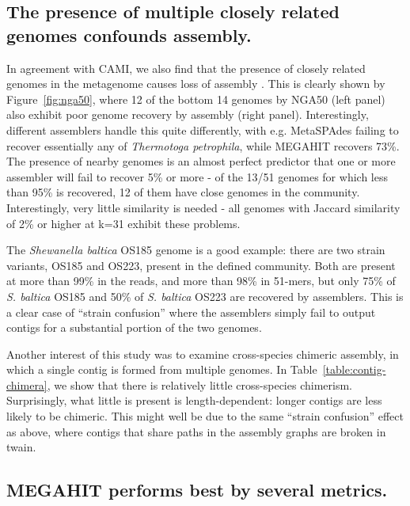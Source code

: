 \documentclass[11pt]{article}
\begin{document}
\subsection*{The presence of multiple closely related genomes confounds assembly.}

In agreement with CAMI, we also find that the presence of closely related
genomes in the metagenome causes loss of assembly \cite{CAMI}.  This is
clearly shown by Figure~\ref{fig:nga50}, where 12 of the bottom 14
genomes by NGA50 (left panel) also exhibit poor genome recovery by
assembly (right panel).  Interestingly, different assemblers handle
this quite differently, with e.g. MetaSPAdes failing to recover
essentially any of {\em Thermotoga petrophila}, while MEGAHIT recovers
73\%.  The presence of nearby genomes is an almost perfect predictor
that one or more assembler will fail to recover 5\% or more - of the
13/51 genomes for which less than 95\% is recovered, 12 of them have
close genomes in the community.  Interestingly, very little similarity
is needed - all genomes with Jaccard similarity of 2\% or higher at k=31
exhibit these problems.

The {\em Shewanella baltica} OS185 genome is a good example: there
are two strain variants, OS185 and OS223, present in the defined
community.  Both are present at more than 99\% in the reads, and more
than 98\% in 51-mers, but only 75\% of {\em S. baltica} OS185 and 50\%
of {\em S. baltica} OS223 are recovered by assemblers.  This is a
clear case of ``strain confusion'' where the assemblers simply fail to
output contigs for a substantial portion of the two genomes.

Another interest of this study was to examine cross-species chimeric
assembly, in which a single contig is formed from multiple genomes.
In Table~\ref{table:contig-chimera}, we show that there is relatively
little cross-species chimerism.  Surprisingly, what little is present is
length-dependent: longer contigs are less likely to be chimeric.  This
might well be due to the same ``strain confusion'' effect as above,
where contigs that share paths in the assembly graphs are broken in twain.

\subsection*{MEGAHIT performs best by several metrics.}
\end{document}
